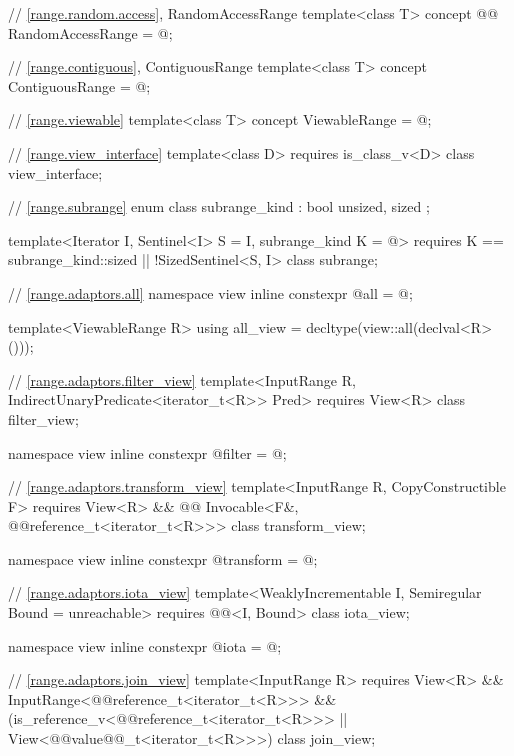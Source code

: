 {\begin{codeblock}
{{    // \ref{range.random.access}, RandomAccessRange
    template<class T>
    concept @@ RandomAccessRange = @\seebelownc@;

    // \ref{range.contiguous}, ContiguousRange
    template<class T>
    concept ContiguousRange = @\seebelownc@;

    // \ref{range.viewable}
    template<class T>
    concept ViewableRange = @\seebelownc@;

    // \ref{range.view_interface}
    template<class D>
      requires is_class_v<D>
    class view_interface;

    // \ref{range.subrange}
    enum class subrange_kind : bool { unsized, sized };

    template<Iterator I, Sentinel<I> S = I, subrange_kind K = @\seebelownc@>
      requires K == subrange_kind::sized || !SizedSentinel<S, I>
    class subrange;

    // \ref{range.adaptors.all}
    namespace view { inline constexpr @\unspec@ all = @\unspecnc@; }

    template<ViewableRange R>
    using all_view = decltype(view::all(declval<R>()));

    // \ref{range.adaptors.filter_view}
    template<InputRange R, IndirectUnaryPredicate<iterator_t<R>> Pred>
      requires View<R>
    class filter_view;

    namespace view { inline constexpr @\unspec@ filter = @\unspecnc@; }

    // \ref{range.adaptors.transform_view}
    template<InputRange R, CopyConstructible F>
      requires View<R> && @@ Invocable<F&, @@reference_t<iterator_t<R>>>
    class transform_view;

    namespace view { inline constexpr @\unspec@ transform = @\unspecnc@; }

    // \ref{range.adaptors.iota_view}
    template<WeaklyIncrementable I, Semiregular Bound = unreachable>
      requires @@<I, Bound>
    class iota_view;

    namespace view { inline constexpr @\unspec@ iota = @\unspecnc@; }

    // \ref{range.adaptors.join_view}
    template<InputRange R>
      requires View<R> && InputRange<@@reference_t<iterator_t<R>>> &&
        (is_reference_v<@@reference_t<iterator_t<R>>> ||
          View<@@value@@_t<iterator_t<R>>>)
    class join_view;

}}
\end{codeblock}}
